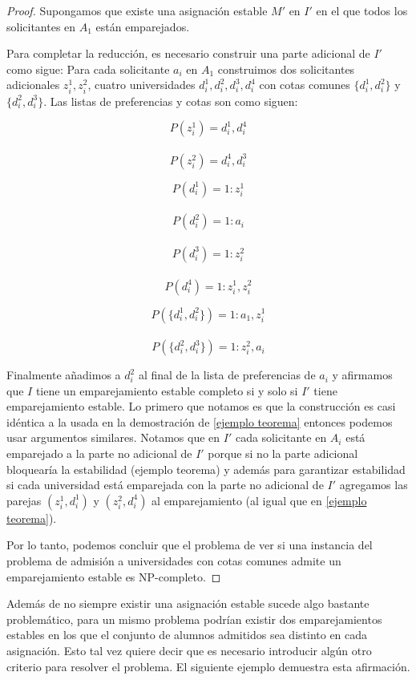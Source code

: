 \begin{proof}
Supongamos que existe una asignación estable $M'$ en $I'$ en el que todos los solicitantes en $A_1$ están emparejados.


Para completar la reducción, es necesario construir una parte adicional de $I'$ como sigue: Para cada solicitante $a_i$ en $A_1$ construimos dos solicitantes adicionales $z_i^1,z_i^2$, cuatro universidades $d_i^1,d_i^2,d_i^3,d_i^4$ con cotas comunes $\{d_i^1,d_i^2\}$ y $\{d_i^2,d_i^3\}$. Las listas de preferencias y cotas son como siguen:
\noindent \begin{minipage}{.3\linewidth}
$$P(z_i^1)=d_i^1,d_i^4$$ \\
$$P(z_i^2)=d_i^4,d_i^3$$ 
\end{minipage}%
\begin{minipage}{.3\linewidth}
$$P(d_i^1)=1:z_i^1$$ \\
$$P(d_i^2)=1:a_i$$ \\
$$P(d_i^3)=1: z_i^2$$ \\
$$P(d_i^4)=1: z_i^1,z_i^2$$ 
\end{minipage}
\begin{minipage}{.4\linewidth}
$$P(\{d_i^1,d_i^2\})= 1:a_1,z_i^1$$ \\
$$P(\{d_i^2,d_i^3\})=1:z_i^2,a_i$$
\end{minipage}

Finalmente añadimos a $d_i^2$ al final de la lista de preferencias de $a_i$ y afirmamos que $I$ tiene un emparejamiento estable completo si y solo si $I'$ tiene emparejamiento estable. Lo primero que notamos es que la construcción es casi idéntica a la usada en la demostración de \ref{ejemplo teorema} entonces podemos usar argumentos similares. Notamos que en $I'$ cada solicitante en $A_i$ está emparejado a la parte no adicional de $I'$ porque si no la parte adicional bloquearía la estabilidad ({ejemplo teorema}) y además para garantizar estabilidad si cada universidad está emparejada con la parte no adicional de $I'$ agregamos las parejas $(z_i^1,d_i^1)$ y $(z_i^2,d_i^4)$ al emparejamiento (al igual que en \ref{ejemplo teorema}).

Por lo tanto, podemos concluir que el problema de ver si una instancia del problema de admisión a universidades con cotas comunes admite un emparejamiento estable es NP-completo.

\end{proof}

Además de no siempre existir una asignación estable sucede algo bastante problemático, para un mismo problema podrían existir dos emparejamientos estables en los que el conjunto de alumnos admitidos sea distinto en cada asignación. Esto tal vez quiere decir que es necesario introducir algún otro criterio para resolver el problema. El siguiente ejemplo demuestra esta afirmación. 

